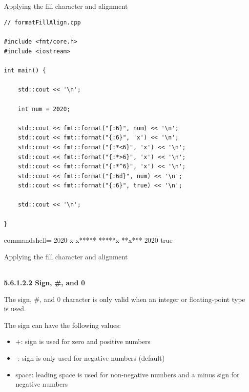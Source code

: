 \hspace*{\fill} \\ %
\noindent
Applying the fill character and alignment
\begin{lstlisting}[style=styleCXX]
// formatFillAlign.cpp

#include <fmt/core.h>
#include <iostream>

int main() {
	
	std::cout << '\n';
	
	int num = 2020;
	
	std::cout << fmt::format("{:6}", num) << '\n';
	std::cout << fmt::format("{:6}", 'x') << '\n';
	std::cout << fmt::format("{:*<6}", 'x') << '\n';
	std::cout << fmt::format("{:*>6}", 'x') << '\n';
	std::cout << fmt::format("{:*^6}", 'x') << '\n';
	std::cout << fmt::format("{:6d}", num) << '\n';
	std::cout << fmt::format("{:6}", true) << '\n';
	
	std::cout << '\n';
	
}
\end{lstlisting}

\begin{tcblisting}{commandshell={}}
  2020
x
x*****
*****x
**x***
  2020
true
\end{tcblisting}

\begin{center}
Applying the fill character and alignment
\end{center}

\hspace*{\fill} \\ %
\noindent
\textbf{5.6.1.2.2\hspace{0.2cm} Sign, \#, and 0}

The sign, \#, and 0 character is only valid when an integer or floating-point type is used.

The sign can have the following values:

\begin{itemize}
\item 
+: sign is used for zero and positive numbers

\item 
-: sign is only used for negative numbers (default)

\item 
space: leading space is used for non-negative numbers and a minus sign for negative numbers
\end{itemize}

